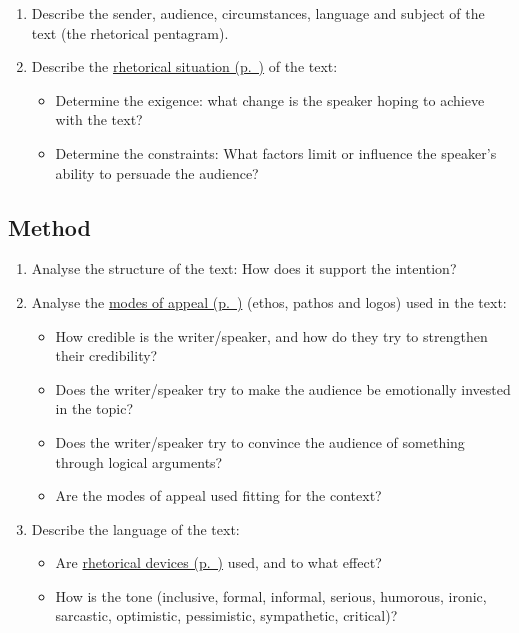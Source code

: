 \documentclass[11pt,a4paper,oneside]{book}
\begin{document}
\begin{enumerate}
\item Describe the sender, audience, circumstances, language and subject of the text (the rhetorical pentagram).
\item Describe the \hyperref[note-rhetorical-situation]{rhetorical situation (p.~\pageref*{note-rhetorical-situation})} of the text:

\begin{itemize}
\item Determine the exigence: what change is the speaker hoping to achieve with the text?
\item Determine the constraints: What factors limit or influence the speaker's ability to persuade the audience?
\end{itemize}

\end{enumerate}

\subsection*{Method}

\begin{enumerate}
\item Analyse the structure of the text: How does it support the intention?
\item Analyse the \hyperref[note-modes-of-appeal]{modes of appeal (p.~\pageref*{note-modes-of-appeal})} (ethos, pathos and logos) used in the text:

\begin{itemize}
\item How credible is the writer/speaker, and how do they try to strengthen their credibility?
\item Does the writer/speaker try to make the audience be emotionally invested in the topic?
\item Does the writer/speaker try to convince the audience of something through logical arguments?
\item Are the modes of appeal used fitting for the context?
\end{itemize}

\item Describe the language of the text:

\begin{itemize}
\item Are \hyperref[note-rhetorical-devices]{rhetorical devices (p.~\pageref*{note-rhetorical-devices})} used, and to what effect?
\item How is the tone (inclusive, formal, informal, serious, humorous, ironic, sarcastic, optimistic, pessimistic, sympathetic, critical)?
\end{itemize}

\end{enumerate}
\end{document}
